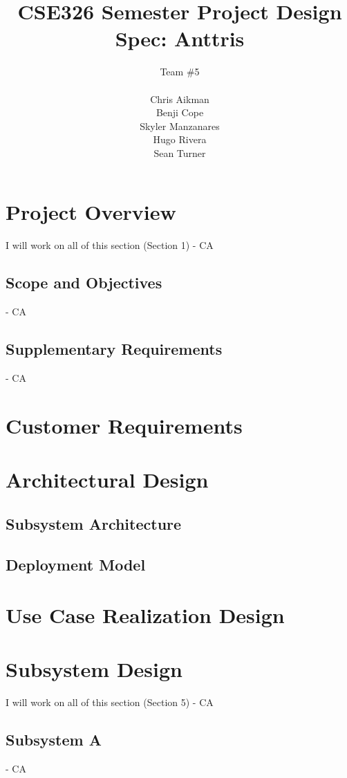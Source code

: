\documentclass[12pt]{article}
\begin{document}
\title{CSE326 Semester Project Design Spec: Anttris}
\author{Team \#5\\\\Chris Aikman\\Benji Cope\\Skyler Manzanares\\Hugo Rivera\\Sean Turner}
\maketitle

\section{Project Overview}
I will work on all of this section (Section 1) - CA
\subsection{Scope and Objectives}
- CA
\subsection{Supplementary Requirements}
- CA
\section{Customer Requirements}
\section{Architectural Design}
\subsection{Subsystem Architecture}
\subsection{Deployment Model}
\section{Use Case Realization Design}
\section{Subsystem Design}
I will work on all of this section (Section 5) - CA
\subsection{Subsystem A}
- CA
\end{document}
